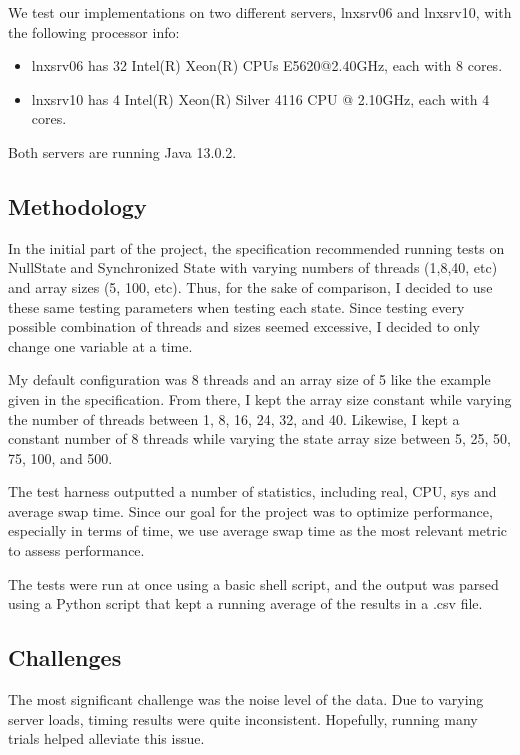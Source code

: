 We test our implementations on two different servers, lnxsrv06 and lnxsrv10, with the following processor info: 

\begin{itemize}

\item lnxsrv06 has 32 Intel(R) Xeon(R) CPUs E5620@2.40GHz, each with 8 cores.
\item lnxsrv10 has 4 Intel(R) Xeon(R) Silver 4116 CPU @ 2.10GHz, each with 4 cores. 

\end{itemize}

\noindent Both servers are running Java 13.0.2.

\subsection{Methodology}

In the initial part of the project, the specification recommended running tests on NullState
and Synchronized State with varying numbers of threads (1,8,40, etc) and array sizes (5, 100, etc). Thus,
for the sake of comparison, I decided to use these same testing parameters when testing each state. 
Since testing every possible combination of threads and sizes seemed excessive, I decided to only change 
one variable at a time. 

My default configuration was 8 threads and an array size of 5 like the example
given in the specification. From there, I kept the array size constant while varying the number of threads
between 1, 8, 16, 24, 32, and 40. Likewise, I kept a constant number of 8 threads while varying
the state array size between 5, 25, 50, 75, 100, and 500. 

The test harness outputted a number of statistics, including real, CPU, sys and average swap time.
Since our goal for the project was to optimize performance, especially in terms of time, we use
average swap time as the most relevant metric to assess performance.

The tests were run at once using a basic shell script, and the output was parsed using a Python script 
that kept a running average of the results in a .csv file. 

\subsection{Challenges}

The most significant challenge was the noise level of the data. Due to varying server loads, 
timing results were quite inconsistent. Hopefully, running many trials helped alleviate this issue.

